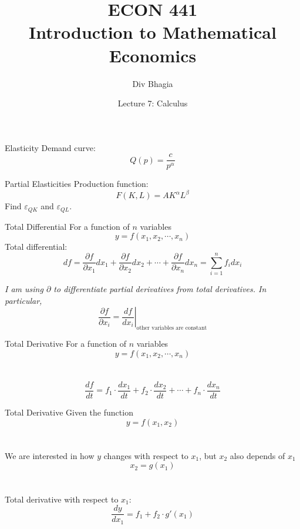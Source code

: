 \documentclass{./../../Latex/teaching_slides}
\begin{document}
\title{ECON 441 \\ \vspace{0.4em} \normalsize Introduction to Mathematical Economics}
\author{Div Bhagia}
\date{Lecture 7: Calculus}

\begin{frame}
\maketitle
\end{frame}

\begin{frame}{Elasticity}
Demand curve:
$$ Q(p) = \frac{c}{p^{\alpha}} $$
\end{frame}

\begin{frame}{Partial Elasticities}
Production function:
$$ F(K,L) = A K^{\alpha} L^{\beta}$$
Find $\varepsilon_{QK}$ and $\varepsilon_{QL}$.
\end{frame}

\begin{frame}{Total Differential}
For a function of $n$ variables \[y=f\left(x_{1}, x_{2}, \cdots, x_{n}\right)\]
Total differential:
\[
d f=\frac{\partial f}{\partial x_{1}} d x_{1}+\frac{\partial f}{\partial x_{2}} d x_{2}+\cdots+\frac{\partial f}{\partial x_{n}} d x_{n}=\sum_{i=1}^{n} f_{i} d x_{i}
\]

\vspace{1em}
\textit{I am using $\partial$ to differentiate partial derivatives from total derivatives. In particular, $$\left.\frac{\partial f}{\partial x_{i}} = \frac{d f}{d x_{i}} \right\vert_{\text{other variables are constant}} $$}
\end{frame}

\begin{frame}{Total Derivative}
For a function of $n$ variables \[y=f\left(x_{1}, x_{2}, \cdots, x_{n}\right)\] \\~\\
\[
\frac{d f}{d t}= f_1 \cdot \frac{d x_{1}}{d t} +f_2\cdot \frac{d x_{2}}{d t}+\cdots+f_n \cdot\frac{d x_{n}}{d t} \]
\end{frame}

\begin{frame}{Total Derivative}
Given the function 
\[ y = f(x_1, x_2) \] \\~\\
We are interested in how $y$ changes with respect to $x_1$, but $x_2$ also depends of $x_1$
\[ x_2 = g(x_1) \] \\~\\
Total derivative with respect to $x_1$:
\[ \frac{dy}{dx_1} =  f_1+f_2 \cdot g'(x_1)   \]
\end{frame}
\end{document}

